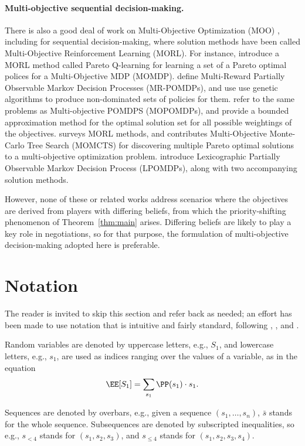 \documentclass{article}  %
\newcommand{\seq}{\bar}
\newcommand{\thm}[1]{Theorem~\ref{thm:#1}}
\begin{document}
\paragraph{Multi-objective sequential decision-making.} There is also a good deal of work on Multi-Objective Optimization (MOO)  \citep{tzeng2011multiple}, including for sequential decision-making, where solution methods have been called Multi-Objective Reinforcement Learning (MORL).  For instance, \citet{gabor1998multi} introduce a MORL method called Pareto Q-learning for learning a set of a Pareto optimal polices for a Multi-Objective MDP (MOMDP).  \citet{soh2011evolving} define Multi-Reward Partially Observable Markov Decision Processes (MR-POMDPs), and use use genetic algorithms to produce non-dominated sets of policies for them.  \citet{roijers2015point} refer to the same problems as Multi-objective POMDPS (MOPOMDPs), and provide a bounded approximation method for the optimal solution set for all possible weightings of the objectives.  \citet{wang2014multi} surveys MORL methods, and contributes Multi-Objective Monte-Carlo Tree Search (MOMCTS) for discovering multiple Pareto optimal solutions to a multi-objective optimization problem.   \citet{wray2015multi} introduce Lexicographic Partially Observable Markov Decision Process (LPOMDPs), along with two accompanying solution methods.

However, none of these or related works address scenarios where the objectives are derived from players with differing beliefs, from which the priority-shifting phenomenon of \thm{main} arises.  Differing beliefs are likely to play a key role in negotiations, so for that purpose, the formulation of multi-objective decision-making adopted here is preferable.

\section{Notation}
The reader is invited to skip this section and refer back as needed; an effort has been made to use notation that is intuitive and fairly standard, following \citet{pearl2009causality}, \citet{hutter2003gentle}, and \citet{orseau2012space}.

Random variables are denoted by uppercase letters, e.g., $S_1$, and lowercase letters, e.g., $s_1$, are used as indices ranging over the values of a variable, as in the equation
\[
\EE[S_1] = \sum_{s_1} \PP(s_1)\cdot s_1.
\]

Sequences are denoted by overbars, e.g., given a sequence $(s_1,\ldots,s_n)$, $\seq s$ stands for the whole sequence.   Subsequences are denoted
by subscripted inequalities, so e.g., $s_{<4}$ stands for $(s_1,s_2,s_3)$,
and $s_{\le 4}$ stands for $(s_1,s_2,s_3,s_4)$.
\end{document}
